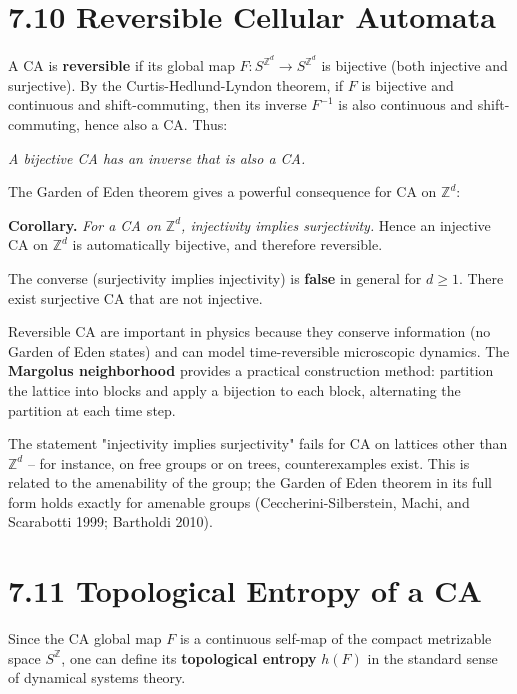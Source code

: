 \section{7.10 Reversible Cellular Automata}

A CA is \textbf{reversible} if its global map $F: S^{\mathbb{Z}^d} \to S^{\mathbb{Z}^d}$ is bijective (both injective and surjective). By the Curtis-Hedlund-Lyndon theorem, if $F$ is bijective and continuous and shift-commuting, then its inverse $F^{-1}$ is also continuous and shift-commuting, hence also a CA. Thus:

\begin{theorem}
\textit{A bijective CA has an inverse that is also a CA.}

The Garden of Eden theorem gives a powerful consequence for CA on $\mathbb{Z}^d$:

\textbf{Corollary.} \textit{For a CA on $\mathbb{Z}^d$, injectivity implies surjectivity.} Hence an injective CA on $\mathbb{Z}^d$ is automatically bijective, and therefore reversible.

The converse (surjectivity implies injectivity) is \textbf{false} in general for $d \geq 1$. There exist surjective CA that are not injective.

Reversible CA are important in physics because they conserve information (no Garden of Eden states) and can model time-reversible microscopic dynamics. The \textbf{Margolus neighborhood} provides a practical construction method: partition the lattice into blocks and apply a bijection to each block, alternating the partition at each time step.
\end{theorem}

\begin{remark}
The statement "injectivity implies surjectivity" fails for CA on lattices other than $\mathbb{Z}^d$ -- for instance, on free groups or on trees, counterexamples exist. This is related to the amenability of the group; the Garden of Eden theorem in its full form holds exactly for amenable groups (Ceccherini-Silberstein, Machi, and Scarabotti 1999; Bartholdi 2010).
\end{remark}


\section{7.11 Topological Entropy of a CA}

Since the CA global map $F$ is a continuous self-map of the compact metrizable space $S^{\mathbb{Z}}$, one can define its \textbf{topological entropy} $h(F)$ in the standard sense of dynamical systems theory.

